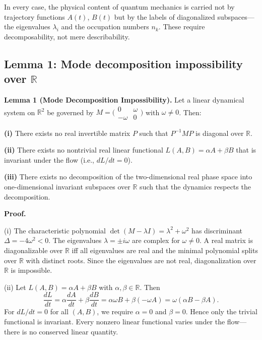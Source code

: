 \documentclass[aps,pra,preprint,groupedaddress,amsmath,amssymb,floatfix]{revtex4-2}
\begin{document}
In every case, the physical content of quantum mechanics is carried not by trajectory functions $A(t)$, $B(t)$ but by the labels of diagonalized subspaces---the eigenvalues $\lambda_i$ and the occupation numbers $n_k$. These require decomposability, not mere describability.

\subsection{Lemma 1: Mode decomposition impossibility over $\mathbb{R}$}
\label{sec:th1_lemma1}

\textbf{Lemma 1 (Mode Decomposition Impossibility).} Let a linear dynamical system on $\mathbb{R}^2$ be governed by $M = \bigl(\begin{smallmatrix}0 & \omega \\ -\omega & 0\end{smallmatrix}\bigr)$ with $\omega \ne 0$. Then:

\textbf{(i)} There exists no real invertible matrix $P$ such that $P^{-1}MP$ is diagonal over $\mathbb{R}$.

\textbf{(ii)} There exists no nontrivial real linear functional $L(A,B) = \alpha A + \beta B$ that is invariant under the flow (i.e., $dL/dt = 0$).

\textbf{(iii)} There exists no decomposition of the two-dimensional real phase space into one-dimensional invariant subspaces over $\mathbb{R}$ such that the dynamics respects the decomposition.

\textbf{Proof.}

(i) The characteristic polynomial $\det(M - \lambda I) = \lambda^2 + \omega^2$ has discriminant $\Delta = -4\omega^2 < 0$. The eigenvalues $\lambda = \pm i\omega$ are complex for $\omega \neq 0$. A real matrix is diagonalizable over $\mathbb{R}$ iff all eigenvalues are real and the minimal polynomial splits over $\mathbb{R}$ with distinct roots. Since the eigenvalues are not real, diagonalization over $\mathbb{R}$ is impossible.

(ii) Let $L(A,B) = \alpha A + \beta B$ with $\alpha,\beta\in\mathbb{R}$. Then
\begin{equation}
\frac{dL}{dt} = \alpha\frac{dA}{dt} + \beta\frac{dB}{dt}
= \alpha\omega B + \beta(-\omega A)
= \omega(\alpha B - \beta A). \label{eq:Ldot}
\end{equation}
For $dL/dt = 0$ for all $(A,B)$, we require $\alpha = 0$ and $\beta = 0$. Hence only the trivial functional is invariant. Every nonzero linear functional varies under the flow---there is no conserved linear quantity.
\end{document}
